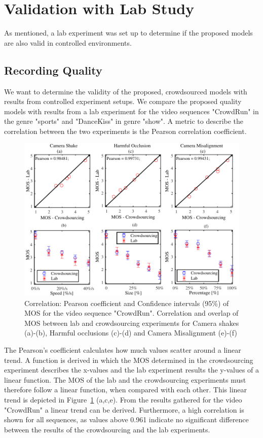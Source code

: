 \section{Validation with Lab Study}
\label{sec:430_correlation}
As mentioned, a lab experiment was set up to determine if the proposed models are also valid in controlled environments.
\subsection{Recording Quality}
We want to determine the validity of the proposed, crowdsourced models with results from controlled experiment setups.
We compare the proposed quality models with results from a lab experiment for the video sequences "CrowdRun" in the genre "sports" and "DanceKiss" in genre "show".
A metric to describe the correlation between the two experiments is the Pearson correlation coefficient. 
\begin{figure}[htb]
	\centering
	\includegraphics{gfx/400_UGV_Quality/correlation.pdf}
	\caption[Correlation of crowdourcing and lab experiments for recording degradations]{Correlation: Pearson coefficient and Confidence intervals (95\%) of MOS for the video sequence "CrowdRun". Correlation and overlap of MOS between lab and crowdsourcing experiments for Camera shakes (a)-(b), Harmful occlusions (c)-(d) and Camera Misalignment (e)-(f)}
	\label{fig:430_correlation}
\end{figure}
The Pearson's coefficient calculates how much values scatter around a linear trend.
A function is derived in which the \ac{MOS} determined in the crowdsourcing experiment describes the x-values and the lab experiment results the y-values of a linear function.
The \ac{MOS} of the lab and the crowdsourcing experiments must therefore follow a linear function, when compared with each other. This linear trend is depicted in Figure~\ref{fig:430_correlation} (a,c,e).
From the results gathered for the video "CrowdRun" a linear trend can be derived.
Furthermore, a high correlation is shown for all sequences, as values above 0.961 indicate no significant difference between the results of the crowdsourcing and the lab experiments. 

